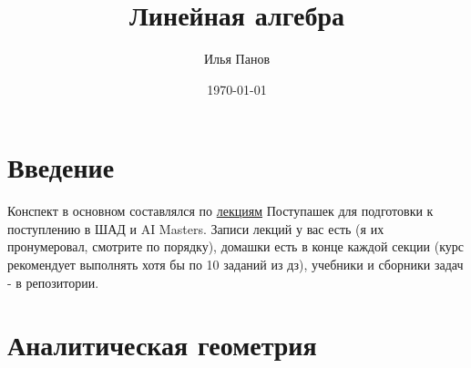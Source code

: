 \documentclass[12pt]{article}
\title{\textbf{\Huge Линейная алгебра}\\}
\author{Илья Панов}
\date{\today}
\begin{document}
\maketitle
\tableofcontents
\newpage







\section{Введение}

Конспект в основном составлялся по \href{https://drive.google.com/drive/folders/1gqBksrkU89tgdOTuxG6GgE3jnozzafNv?usp=sharing}{лекциям} Поступашек для подготовки к поступлению в ШАД и AI Masters. Записи лекций у вас есть (я их пронумеровал, смотрите по порядку), домашки есть в конце каждой секции (курс рекомендует выполнять хотя бы по 10 заданий из дз), учебники и сборники задач - в репозитории.

\section{Аналитическая геометрия}
\end{document}
